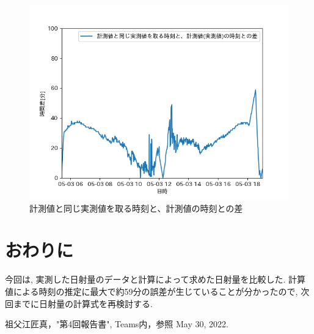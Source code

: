 \documentclass[a4j,12pt,]{jarticle}
\begin{document}
\begin{figure}[H]
  \begin{center}
    \includegraphics[width=160mm]{timeDiff.png}
    \caption{計測値と同じ実測値を取る時刻と、計測値の時刻との差}
    \label{p2}
  \end{center}
\end{figure}

\section{おわりに}
今回は, 実測した日射量のデータと計算によって求めた日射量を比較した.
計算値による時刻の推定に最大で約59分の誤差が生じていることが分かったので, 次回までに日射量の計算式を再検討する.

\begin{thebibliography}{5}
  祖父江匠真，"第4回報告書", Teams内，参照 May 30, 2022.
\end{thebibliography}
\end{document}
